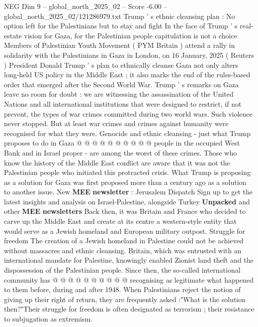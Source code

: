 \begin{textsample}{NEG Dim 9 – global\_north\_2025\_02 – Score -6.00 – global\_north\_2025\_02/121286979.txt}  \label{ex:f9_neg_019}
Trump ' s ethnic cleansing plan : No option left for the Palestinians but to stay and fight In the face of Trump ' s real-estate vision for Gaza, for the Palestinian people capitulation is not a choice Members of Palestinian Youth Movement ( PYM Britain ) attend a rally in solidarity with the Palestinians in Gaza in London, on 16 January, 2025 ( Reuters ) President Donald Trump ' s plan to ethnically cleanse Gaza not only alters long-held US policy in the Middle East ; it also marks the end of the rules-based order that emerged after the Second World War.
Trump ' s remarks on Gaza leave no room for doubt : we are witnessing the assassination of the United Nations and all international institutions that were designed to restrict, if not prevent, the types of war crimes committed during two world wars.
Such violence never stopped.
But at least war crimes and crimes against humanity were recognised for what they were.
Genocide and ethnic cleansing - just what Trump proposes to do in Gaza @ @ @ @ @ @ @ @ @ @ people in the occupied West Bank and in Israel proper - are among the worst of these crimes.
Those who know the history of the Middle East conflict are aware that it was not the Palestinian people who initiated this protracted crisis.
What Trump is proposing as a solution for Gaza was first proposed more than a century ago as a solution to another issue.
New \textbf{MEE} \textbf{newsletter} : Jerusalem Dispatch Sign up to get the latest insights and analysis on Israel-Palestine, alongside Turkey \textbf{Unpacked} and other \textbf{MEE} \textbf{newsletters} Back then, it was Britain and France who decided to carve up the Middle East and create at its centre a western-style entity that would serve as a Jewish homeland and European military outpost.
Struggle for freedom The creation of a Jewish homeland in Palestine could not be achieved without massacres and ethnic cleansing.
Britain, which was entrusted with an international mandate for Palestine, knowingly enabled Zionist land theft and the dispossession of the Palestinian people.
Since then, the so-called international community has @ @ @ @ @ @ @ @ @ @ recognising as legitimate what happened to them before, during and after 1948.
When Palestinians reject the notion of giving up their right of return, they are frequently asked :"What is the solution then?"Their struggle for freedom is often designated as terrorism ; their resistance to subjugation as extremism.

\end{textsample}
